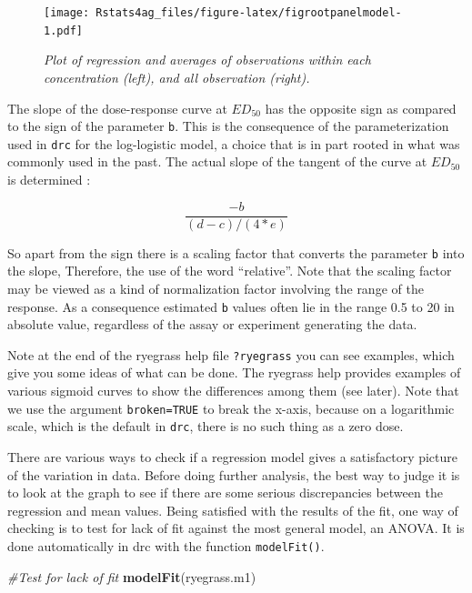 \documentclass[letterpaper,]{book}
\newenvironment{Shaded}{\begin{snugshade}}{\end{snugshade}}
\newcommand{\CommentTok}[1]{\textcolor[rgb]{0.56,0.35,0.01}{\textit{#1}}}
\newcommand{\KeywordTok}[1]{\textcolor[rgb]{0.13,0.29,0.53}{\textbf{#1}}}
\newcommand{\NormalTok}[1]{#1}
\begin{document}
\begin{figure}
\centering
\texttt{[image: Rstats4ag\_files/figure-latex/figrootpanelmodel-1.pdf]}
\caption{\label{fig:figrootpanelmodel}\emph{Plot of regression and averages of observations within each concentration (left), and all observation (right).}}
\end{figure}

The slope of the dose-response curve at \(ED_{50}\) has the opposite sign as compared to the sign of the parameter \texttt{b}. This is the consequence of the parameterization used in \texttt{drc} for the log-logistic model, a choice that is in part rooted in what was commonly used in the past. The actual slope of the tangent of the curve at \(ED_{50}\) is determined :

\[\frac{-b}{(d-c)/(4*e)}\]

So apart from the sign there is a scaling factor that converts the parameter \texttt{b} into the slope, Therefore, the use of the word ``relative''. Note that the scaling factor may be viewed as a kind of normalization factor involving the range of the response. As a consequence estimated \texttt{b} values often lie in the range 0.5 to 20 in absolute value, regardless of the assay or experiment generating the data.

Note at the end of the ryegrass help file \texttt{?ryegrass} you can see examples, which give you some ideas of what can be done. The ryegrass help provides examples of various sigmoid curves to show the differences among them (see later). Note that we use the argument \texttt{broken=TRUE} to break the x-axis, because on a logarithmic scale, which is the default in \texttt{drc}, there is no such thing as a zero dose.

There are various ways to check if a regression model gives a satisfactory picture of the variation in data. Before doing further analysis, the best way to judge it is to look at the graph to see if there are some serious discrepancies between the regression and mean values. Being satisfied with the results of the fit, one way of checking is to test for lack of fit against the most general model, an ANOVA. It is done automatically in drc with the function \texttt{modelFit()}.

\begin{Shaded}
\begin{Highlighting}[]
\CommentTok{#Test for lack of fit}
\KeywordTok{modelFit}\NormalTok{(ryegrass.m1)}
\end{Highlighting}
\end{Shaded}
\end{document}
